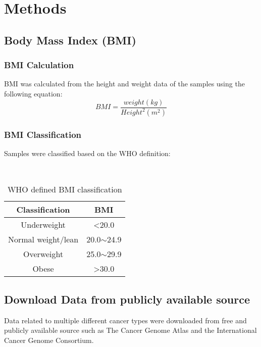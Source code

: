\chapter{Methods}

\section{Body Mass Index (BMI)}

\subsection{BMI Calculation}

BMI was calculated from the height and weight data of the samples using the following equation:\\
\begin{equation}
    BMI = \frac{weight (kg)}{Height^2(m^2)}
\end{equation}

\subsection{BMI Classification}

Samples were classified based on the WHO definition:
\begin{table}[h]
    \caption{WHO defined BMI classification}\\
    \label{tab:who-bmi-class}
    \begin{center}
        \begin{tabular}{|c|c|}
            \hline
            \bfseries {Classification} & \bfseries {BMI}\\
            \hline
            Underweight & \textless 20.0\\
            Normal weight/lean & 20.0$\sim$24.9\\
            Overweight & 25.0$\sim$29.9\\
            Obese & \textgreater 30.0\\
            \hline
        \end{tabular}
    \end{center}
\end{table}

\section{Download Data from publicly available source}

Data related to multiple different cancer types were downloaded from free and publicly available source such as The Cancer Genome Atlas and the International Cancer Genome Consortium.

